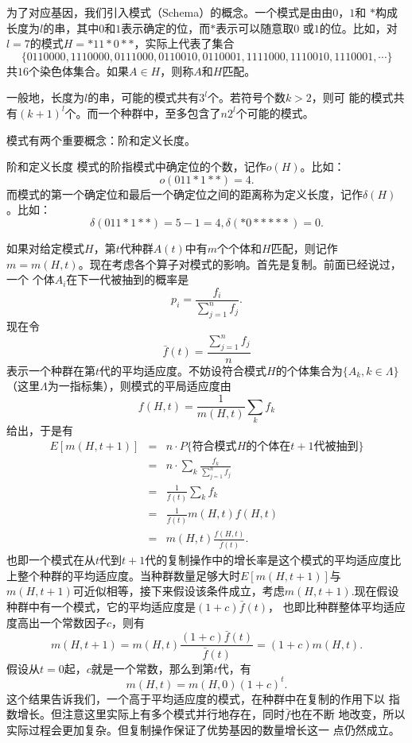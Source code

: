 为了对应基因，我们引入模式（Schema）的概念。一个模式是由由$0$，$1$和
$*$构成长度为$l$的串，其中$0$和$1$表示确定的位，而$*$表示可以随意取$0$
或$1$的位。比如，对$l = 7$的模式$H = *11*0**$，实际上代表了集合
$$
\{0110000, 1110000, 0111000, 0110010, 0110001, 1111000, 1110010, 1110001, \cdots\}
$$
共$16$个染色体集合。如果$A \in H$，则称$A$和$H$匹配。

一般地，长度为$l$的串，可能的模式共有$3^l$个。若符号个数$k > 2$，则可
能的模式共有$(k + 1)^l$个。而一个种群中，至多包含了$n2^l$个可能的模式。

模式有两个重要概念：阶和定义长度。

\begin{definition}{\hei 阶和定义长度}
模式的阶指模式中确定位的个数，记作$o(H)$。比如：
$$
o(011*1**) = 4.
$$
而模式的第一个确定位和最后一个确定位之间的距离称为定义长度，记作$\delta(H)$。比如：
$$
\delta(011*1**) = 5 - 1 = 4, \delta(*0*****) = 0.
$$
\end{definition}

如果对给定模式$H$，第$t$代种群$A(t)$中有$m$个个体和$H$匹配，则记作$m =
m(H, t)$。现在考虑各个算子对模式的影响。首先是复制。前面已经说过，一个
个体$A_i$在下一代被抽到的概率是
$$
p_i = \frac{f_i}{\sum_{j = 1}^n f_j}.
$$
现在令
$$
\bar{f}(t) = \frac{\sum_{j = 1}^n f_j}{n}
$$
表示一个种群在第$t$代的平均适应度。不妨设符合模式$H$的个体集合为$\{A_k,k\in \Lambda\}$（这里$\Lambda$为一指标集），则模式的平局适应度由
\[
f(H,t)=\frac{1}{m(H,t)}\sum_k f_k
\]
给出，于是有
\begin{eqnarray*}
  E[m(H, t + 1)] & = & n\cdot P\{\text{符合模式$H$的个体在$t+1$代被抽到}\}\\
  & = & n\cdot\sum_k \frac{f_k}{\sum_{j=1}^n f_j}\\
  & = & \frac{1}{\bar{f}(t)}\sum_k f_k\\
  & = & \frac{1}{\bar{f}(t)}m(H,t)f(H,t)\\
  & = & m(H, t) \frac{f(H,t)}{\bar{f}(t)}.
\end{eqnarray*}
也即一个模式在从$t$代到$t+1$代的复制操作中的增长率是这个模式的平均适应度比上整个种群的平均适应度。当种群数量足够大时$E[m(H,t+1)]$与$m(H,t+1)$可近似相等，接下来假设该条件成立，考虑$m(H,t+1)$.现在假设种群中有一个模式，它的平均适应度是$(1 + c)\bar{f}(t)$，
也即比种群整体平均适应度高出一个常数因子$c$，则有
$$
m(H, t + 1) = m(H, t) \frac{(1+c)\bar{f}(t)}{\bar{f}(t)} = (1 + c)m(H, t).
$$
假设从$t = 0$起，$c$就是一个常数，那么到第$t$代，有
$$
m(H, t) = m(H, 0)(1 + c)^t.
$$
这个结果告诉我们，一个高于平均适应度的模式，在种群中在复制的作用下以
指数增长。但注意这里实际上有多个模式并行地存在，同时$\bar{f}$也在不断
地改变，所以实际过程会更加复杂。但复制操作保证了优势基因的数量增长这一
点仍然成立。

